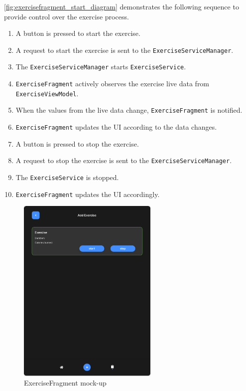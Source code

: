 \autoref{fig:exercisefragment_start_diagram} demonstrates the following sequence to provide control over the exercise process.
\begin{enumerate}
    \item A button is pressed to start the exercise.
    \item A request to start the exercise is sent to the \texttt{ExerciseServiceManager}.
    \item The \texttt{ExerciseServiceManager} starts \texttt{ExerciseService}.
    \item \texttt{ExerciseFragment} actively observes the exercise live data from \texttt{ExerciseViewModel}.
    \item When the values from the live data change, \texttt{ExerciseFragment} is notified.
    \item \texttt{ExerciseFragment} updates the UI according to the data changes.
    \item A button is pressed to stop the exercise.
    \item A request to stop the exercise is sent to the \texttt{ExerciseServiceManager}.
    \item The \texttt{ExerciseService} is stopped.
    \item \texttt{ExerciseFragment} updates the UI accordingly.
\end{enumerate}

\begin{figure}[H]
    \centering
    \includegraphics[width=0.6\textwidth]{images/exercise-fragment-mockup.png}
    \caption{ExerciseFragment mock-up}
    \label{fig:exercisefragment_mockup}
\end{figure}

